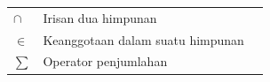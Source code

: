 \begin{longtable}{@{} l >{\raggedright\arraybackslash}p{7cm} c @{}}
$\cap$                           & Irisan dua himpunan                                                           & \pageref{chap:perancangan} \\
$\in$                            & Keanggotaan dalam suatu himpunan                                              & \pageref{chap:perancangan} \\
$\sum$                           & Operator penjumlahan                                                          & \pageref{chap:studi-literatur} \\

\end{longtable}
